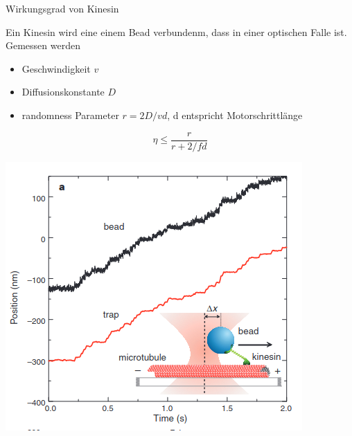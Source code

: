 \documentclass[aspectratio=1610, 9pt]{beamer}
\begin{document}
\begin{frame}{Wirkungsgrad von Kinesin}
  
  \begin{minipage}{0.5\textwidth}
    Ein Kinesin wird eine einem Bead verbundenm, dass in einer optischen Falle ist.
    Gemessen werden
    \begin{itemize}
      \item Geschwindigkeit $v$
      \item Diffusionskonstante $D$
      \item randomness Parameter $r= 2 D / v d $, d entspricht Motorschrittlänge
    \end{itemize}

    \begin{equation*}
      \eta \leq  \frac{ r}{ r + 2 / f d }
    \end{equation*}

  \end{minipage}
\begin{minipage}{0.4\textwidth}
    \begin{center}
      \includegraphics[width=\textwidth]{images/kinesin_pos.png}
    \end{center}
  \end{minipage}

\end{frame}
\end{document}

